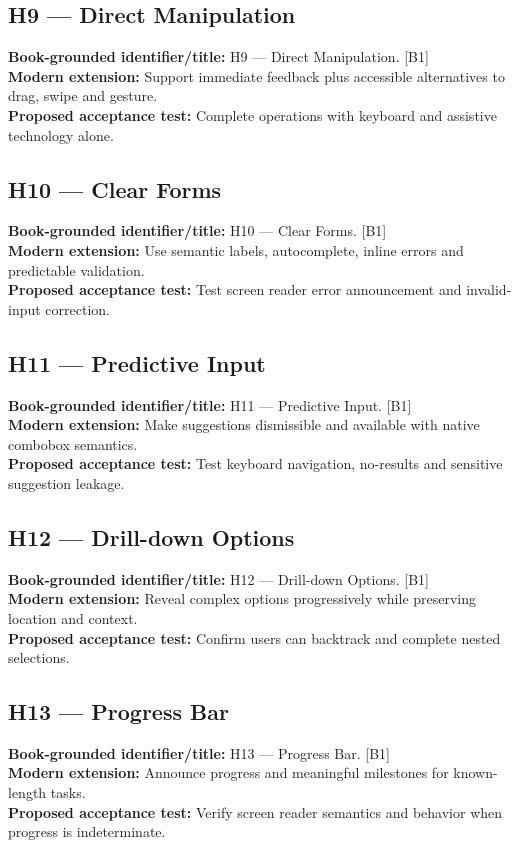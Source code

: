 \documentclass[11pt]{article}
\begin{document}
\subsection{H9 — Direct Manipulation}
\noindent\textcolor{Ocean}{\textbf{Book-grounded identifier/title:}} H9 — Direct Manipulation. [B1]\\
\textcolor{Mint}{\textbf{Modern extension:}} Support immediate feedback plus accessible alternatives to drag, swipe and gesture.\\
\textcolor{Amber}{\textbf{Proposed acceptance test:}} Complete operations with keyboard and assistive technology alone.\medskip
\subsection{H10 — Clear Forms}
\noindent\textcolor{Ocean}{\textbf{Book-grounded identifier/title:}} H10 — Clear Forms. [B1]\\
\textcolor{Mint}{\textbf{Modern extension:}} Use semantic labels, autocomplete, inline errors and predictable validation.\\
\textcolor{Amber}{\textbf{Proposed acceptance test:}} Test screen reader error announcement and invalid-input correction.\medskip
\subsection{H11 — Predictive Input}
\noindent\textcolor{Ocean}{\textbf{Book-grounded identifier/title:}} H11 — Predictive Input. [B1]\\
\textcolor{Mint}{\textbf{Modern extension:}} Make suggestions dismissible and available with native combobox semantics.\\
\textcolor{Amber}{\textbf{Proposed acceptance test:}} Test keyboard navigation, no-results and sensitive suggestion leakage.\medskip
\subsection{H12 — Drill-down Options}
\noindent\textcolor{Ocean}{\textbf{Book-grounded identifier/title:}} H12 — Drill-down Options. [B1]\\
\textcolor{Mint}{\textbf{Modern extension:}} Reveal complex options progressively while preserving location and context.\\
\textcolor{Amber}{\textbf{Proposed acceptance test:}} Confirm users can backtrack and complete nested selections.\medskip
\subsection{H13 — Progress Bar}
\noindent\textcolor{Ocean}{\textbf{Book-grounded identifier/title:}} H13 — Progress Bar. [B1]\\
\textcolor{Mint}{\textbf{Modern extension:}} Announce progress and meaningful milestones for known-length tasks.\\
\textcolor{Amber}{\textbf{Proposed acceptance test:}} Verify screen reader semantics and behavior when progress is indeterminate.\medskip
\end{document}
